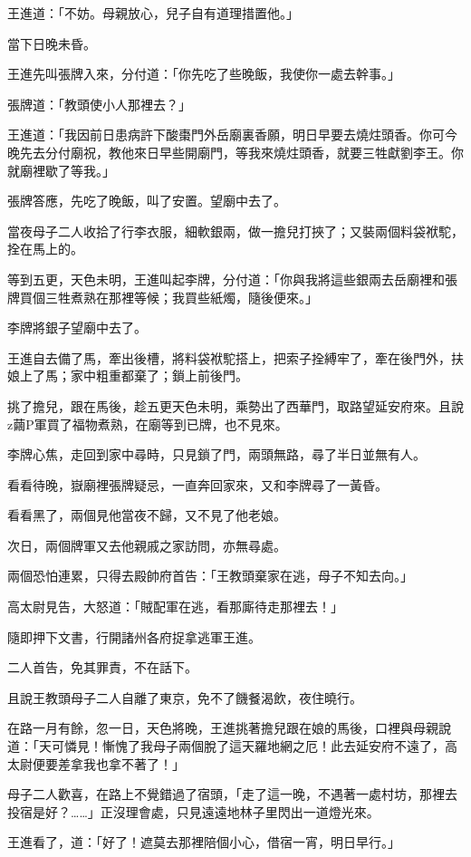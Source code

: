 \documentclass[11pt,a4paper]{article}
\begin{document}
王進道：「不妨。母親放心，兒子自有道理措置他。」

當下日晚未昏。

王進先叫張牌入來，分付道：「你先吃了些晚飯，我使你一處去幹事。」

張牌道：「教頭使小人那裡去？」

王進道：「我因前日患病許下酸棗門外岳廟裏香願，明日早要去燒炷頭香。你可今晚先去分付廟祝，教他來日早些開廟門，等我來燒炷頭香，就要三牲獻劉李王。你就廟裡歇了等我。」

張牌答應，先吃了晚飯，叫了安置。望廟中去了。

當夜母子二人收拾了行李衣服，細軟銀兩，做一擔兒打挾了；又裝兩個料袋袱駝，拴在馬上的。

等到五更，天色未明，王進叫起李牌，分付道：「你與我將這些銀兩去岳廟裡和張牌買個三牲煮熟在那裡等候；我買些紙燭，隨後便來。」

李牌將銀子望廟中去了。

王進自去備了馬，牽出後槽，將料袋袱駝搭上，把索子拴縛牢了，牽在後門外，扶娘上了馬；家中粗重都棄了；鎖上前後門。

挑了擔兒，跟在馬後，趁五更天色未明，乘勢出了西華門，取路望延安府來。且說z繭P軍買了福物煮熟，在廟等到已牌，也不見來。

李牌心焦，走回到家中尋時，只見鎖了門，兩頭無路，尋了半日並無有人。

看看待晚，嶽廟裡張牌疑忌，一直奔回家來，又和李牌尋了一黃昏。

看看黑了，兩個見他當夜不歸，又不見了他老娘。

次日，兩個牌軍又去他親戚之家訪問，亦無尋處。

兩個恐怕連累，只得去殿帥府首告：「王教頭棄家在逃，母子不知去向。」

高太尉見告，大怒道：「賊配軍在逃，看那廝待走那裡去！」

隨即押下文書，行開諸州各府捉拿逃軍王進。

二人首告，免其罪責，不在話下。

且說王教頭母子二人自離了東京，免不了饑餐渴飲，夜住曉行。

在路一月有餘，忽一日，天色將晚，王進挑著擔兒跟在娘的馬後，口裡與母親說道：「天可憐見！慚愧了我母子兩個脫了這天羅地網之厄！此去延安府不遠了，高太尉便要差拿我也拿不著了！」

母子二人歡喜，在路上不覺錯過了宿頭，「走了這一晚，不遇著一處村坊，那裡去投宿是好？……」正沒理會處，只見遠遠地林子里閃出一道燈光來。

王進看了，道：「好了！遮莫去那裡陪個小心，借宿一宵，明日早行。」
\end{document}
